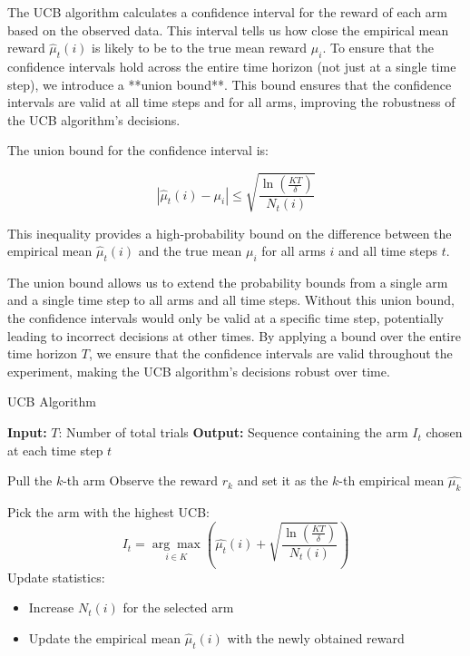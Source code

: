 The UCB algorithm calculates a confidence interval for the reward of each arm based on the observed data. This interval tells us how close the empirical mean reward $\hat{\mu}_t(i)$ is likely to be to the true mean reward $\mu_i$. To ensure that the confidence intervals hold across the entire time horizon (not just at a single time step), we introduce a **union bound**. This bound ensures that the confidence intervals are valid at all time steps and for all arms, improving the robustness of the UCB algorithm's decisions.

The union bound for the confidence interval is:

$$
    |\hat{\mu}_t(i) - \mu_i| \leq \sqrt{\frac{\ln\left(\frac{KT}{\delta}\right)}{N_t(i)}}
$$

This inequality provides a high-probability bound on the difference between the empirical mean $\hat{\mu}_t(i)$ and the true mean $\mu_i$ for all arms $i$ and all time steps $t$.

The union bound allows us to extend the probability bounds from a single arm and a single time step to all arms and all time steps. Without this union bound, the confidence intervals would only be valid at a specific time step, potentially leading to incorrect decisions at other times. By applying a bound over the entire time horizon $T$, we ensure that the confidence intervals are valid throughout the experiment, making the UCB algorithm's decisions robust over time.

\begin{algorithm}
    \caption{UCB Algorithm}
    \begin{algorithmic}[1]
        \State \textbf{Input:} $T$: Number of total trials
        \State \textbf{Output:} Sequence containing the arm $I_t$ chosen at each time step $t$

        \State Pull the $k$-th arm
        \State Observe the reward $r_k$ and set it as the $k$-th empirical mean $\hat{\mu_k}$
        \EndFor

        \State Pick the arm with the highest UCB:
        \[
            I_t = \underset{i \in K}{\arg\max} \left( \hat{\mu_t}(i) + \sqrt{\frac{\ln\left(\frac{KT}{\delta}\right)}{N_t(i)}} \right)
        \]
        \State Update statistics:
        \begin{itemize}
            \item Increase $N_t(i)$ for the selected arm
            \item Update the empirical mean $\hat{\mu}_t(i)$ with the newly obtained reward
        \end{itemize}
        \EndFor

    \end{algorithmic}
\end{algorithm}

